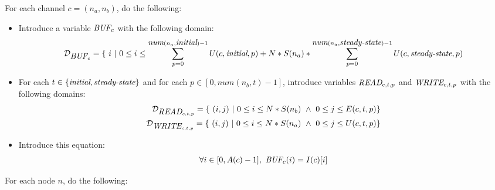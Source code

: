 For each channel $c = (n_a, n_b)$, do the following:
\begin{itemize}
\item Introduce a variable $\mbox{\it BUF}_c$ with the following domain:
\begin{align*}
{\cal D}_{\mbox{\it BUF}_c} = \{~i~|~0 \le i \le \sum_{p=0}^{\mbox{\it num}(n_a,
\mbox{\it initial})-1} U(c, \mbox{\it initial}, p) + N * S(n_a) *
\sum_{p=0}^{\mbox{\it num}(n_a, \mbox{\it steady-state})-1} U(c,
\mbox{\it steady-state}, p)
\end{align*}
\item For each $t \in \{\mbox{\it initial}, \mbox{\it steady-state}\}$ and for
each $p \in [0, num(n_b, t)-1]$, introduce variables $\mbox{\it READ}_{c, t,
p}$ and $\mbox{\it WRITE}_{c, t, p}$ with the following domains:
\begin{align*}
{\cal D}_{\mbox{\it READ}_{c, t, p}} = \{~(i,j)~|~0 \le i \le N * S(n_b) ~\wedge~ 0 \le j \le E(c, t, p)\} \\
{\cal D}_{\mbox{\it WRITE}_{c, t, p}} = \{~(i,j)~|~0 \le i \le N * S(n_a) ~\wedge~ 0 \le j \le U(c, t, p)\} \\
\end{align*}
\item Introduce this equation:
\begin{align*}
\forall i \in [0,A(c)-1],~{\mbox{\it BUF}_c}(i) = I(c)[i]
\end{align*}
\end{itemize}
For each node $n$, do the following:
